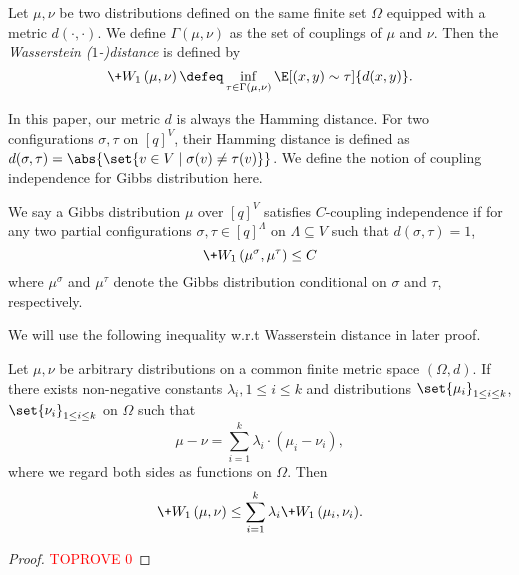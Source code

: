 \documentclass[a4paper,11pt]{article}
\newcommand{\W}[1]{\+W_1\left(#1\right)}
\begin{document}
\begin{definition}
    Let $\mu, \nu$ be two distributions defined on the same finite set $\Omega$ equipped with a metric $d(\cdot, \cdot)$. We define $\Gamma(\mu, \nu)$ as the set of couplings of $\mu$ and $\nu$. Then the \emph{Wasserstein ($1$-)distance} is defined by
    \[
    \W{\mu, \nu} \defeq
    \inf_{\tau\in \Gamma(\mu, \nu)} \E[(x, y)\sim \tau]{d(x, y)}.
    \]
\end{definition}


In this paper, our metric $d$ is always the Hamming distance. For two configurations $\sigma, \tau$ on $[q]^V$, their Hamming distance is defined as $d(\sigma, \tau)=\abs{\set{v \in V \mid \sigma(v)\neq \tau(v)}}$. We define the notion of coupling independence for Gibbs distribution here.
\begin{definition}
    We say a Gibbs distribution $\mu$ over $[q]^V$ satisfies $C$-coupling independence if for any two partial configurations $\sigma, \tau \in [q]^\Lambda$ on $\Lambda \subseteq V$ such that $d(\sigma, \tau)=1$,
    $$
\W{\mu^\sigma, \mu^\tau} \leq C
$$
where $\mu^\sigma$ and $\mu^\tau$ denote the Gibbs distribution conditional on $\sigma$ and $\tau$, respectively.
\end{definition}

We will use the following inequality w.r.t Wasserstein distance in later proof.
\begin{proposition}\label{prop:coupling-convex-decomposition}
    Let $\mu, \nu$ be arbitrary distributions on a common finite metric space $(\Omega, d)$.
    If there exists non-negative constants $\lambda_i, 1\le i\le k$
    and distributions $\set{\mu_i}_{1\le i\le k}$, $\set{\nu_i}_{1\le i\le k}$ on $\Omega$ such that
    \[
    \mu - \nu = \sum_{i=1}^k\lambda_i\cdot(\mu_i - \nu_i),
    \]
    where we regard both sides as functions on $\Omega$.
    Then
    \[
    \W{\mu, \nu} \le \sum_{i=1}^k \lambda_i{\W{\mu_i, \nu_i}}.
    \]
\end{proposition}
\begin{proof}\textcolor{red}{TOPROVE 0}\end{proof}
\end{document}
